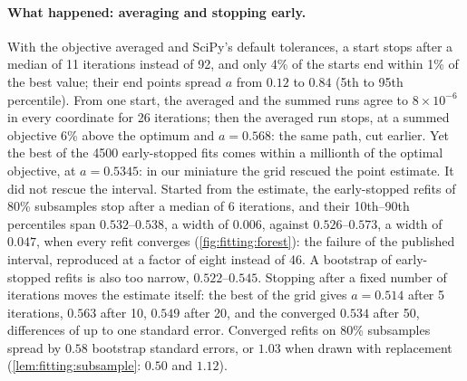 \begin{refsection}
\paragraph{What happened: averaging and stopping early.} With the objective averaged and SciPy's default tolerances, a start stops after a median of 11 iterations instead of 92, and only 4\% of the starts end within 1\% of the best value; their end points spread $a$ from $0.12$ to $0.84$ (5th to 95th percentile). From one start, the averaged and the summed runs agree to $8\times10^{-6}$ in every coordinate for 26 iterations; then the averaged run stops, at a summed objective 6\% above the optimum and $a=0.568$: the same path, cut earlier. Yet the best of the 4500 early-stopped fits comes within a millionth of the optimal objective, at $a=0.5345$: in our miniature the grid rescued the point estimate. It did not rescue the interval. Started from the estimate, the early-stopped refits of 80\% subsamples stop after a median of 6 iterations, and their 10th--90th percentiles span $0.532$--$0.538$, a width of $0.006$, against $0.526$--$0.573$, a width of $0.047$, when every refit converges (\cref{fig:fitting:forest}): the failure of the published interval, reproduced at a factor of eight instead of 46. A bootstrap of early-stopped refits is also too narrow, $0.522$--$0.545$. Stopping after a fixed number of iterations moves the estimate itself: the best of the grid gives $a=0.514$ after 5 iterations, $0.563$ after 10, $0.549$ after 20, and the converged $0.534$ after 50, differences of up to one standard error. Converged refits on 80\% subsamples spread by $0.58$ bootstrap standard errors, or $1.03$ when drawn with replacement (\cref{lem:fitting:subsample}: $0.50$ and $1.12$).


\end{refsection}
